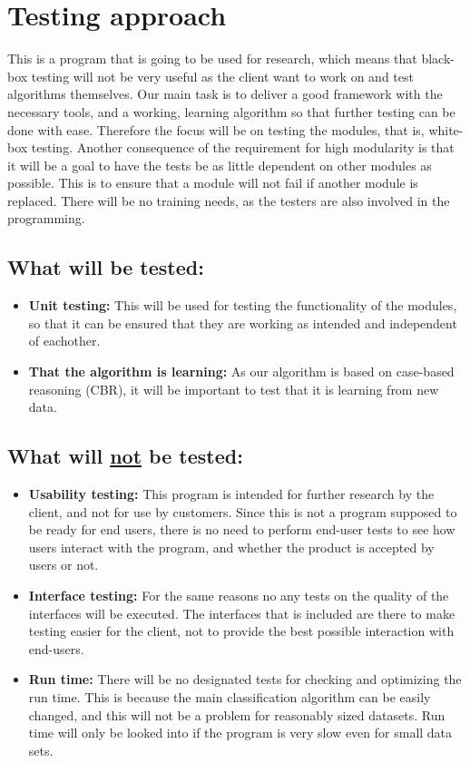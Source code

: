 \section{Testing approach}
This is a program that is going to be used for research, which means that black-box testing will not be very useful as the client want to work on and test algorithms themselves. Our main task is to deliver a good framework with the necessary tools, and a working, learning algorithm so that further testing can be done with ease. Therefore the focus will be on testing the modules, that is, white-box testing. Another consequence of the requirement for high modularity is that it will be a goal to have the tests be as little dependent on other modules as possible. This is to ensure that a module will not fail if another module is replaced. There will be no training needs, as the testers are also involved in the programming.

		\subsection{What will be tested:}
			\begin{itemize}
				\renewcommand{\labelitemi}{$\bullet$}
					\item \textbf{Unit testing:} This will be used for testing the functionality of the modules, so that it can be ensured that they are working as intended and independent of eachother.
					\item \textbf{That the algorithm is learning:} As our algorithm is based on case-based reasoning (CBR), it will be important to test that it is learning from new data.
			\end{itemize}

		\subsection{What will \underline{not} be tested:}
			\begin{itemize}
				\renewcommand{\labelitemi}{$\bullet$}
					\item \textbf{Usability testing:} This program is intended for further research by the client, and not for use by customers. Since this is not a program supposed to be ready for end users, there is no need to perform end-user tests to see how users interact with the 							program, and whether the product is accepted by users or not.
					\item \textbf{Interface testing:} For the same reasons no any tests on the quality of the interfaces will be executed. The interfaces that is included are there to make testing easier for the client, not to provide the best possible interaction with end-users.
					\item \textbf{Run time:} There will be no designated tests for checking and optimizing the run time. This is because the main classification algorithm can be easily changed, and this will not be a problem for reasonably sized datasets. Run time will only be looked into if the program is very slow even for small data sets.
			\end{itemize}
		
